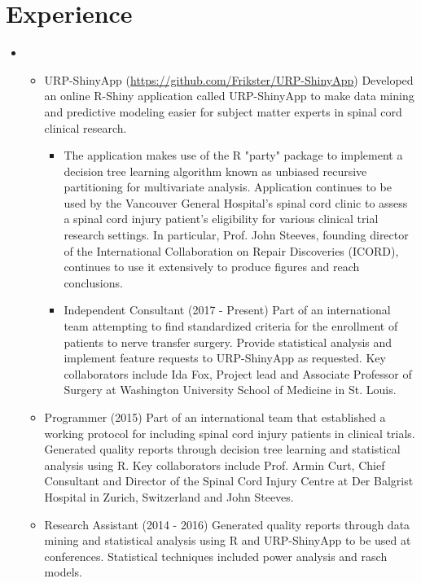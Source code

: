 \documentclass[11pt,a4paper,sans]{moderncv}        %
\begin{document}
\section{Experience}
\begin{itemize}
    \item{}
     
 \begin{itemize}
      \item{URP-ShinyApp (\href{https://github.com/Frikster/URP-ShinyApp}{https://github.com/Frikster/URP-ShinyApp})}
          {Developed an online R-Shiny application called URP-ShinyApp to make data mining and predictive modeling easier for subject matter experts in spinal cord clinical research.}
          \begin{itemize}
          \item{The application makes use of the R "party" package to implement a decision tree learning algorithm known as unbiased recursive partitioning for multivariate analysis. Application continues to be used by the Vancouver General Hospital's spinal cord clinic to assess a spinal cord injury patient's eligibility for various clinical trial research settings. In particular, Prof. John Steeves, founding director of the International Collaboration on Repair Discoveries (ICORD), continues to use it extensively to produce figures and reach conclusions.}
          \item{Independent Consultant (2017 - Present)}
          {Part of an international team attempting to find standardized criteria for the enrollment of patients to nerve transfer surgery. Provide statistical analysis and implement feature requests to URP-ShinyApp as requested. Key collaborators include Ida Fox, Project lead and Associate Professor of Surgery at Washington University School of Medicine in St. Louis.}
          \end{itemize}
        \item{Programmer (2015)}
          {Part of an international team that established a working protocol for including spinal cord injury patients in clinical trials. Generated quality reports through decision tree learning and statistical analysis using R. Key collaborators include Prof. Armin Curt, Chief Consultant and Director of the Spinal Cord Injury Centre at Der Balgrist Hospital in Zurich, Switzerland and John Steeves.}
        \item{Research Assistant (2014 - 2016)}
          {Generated quality reports through data mining and statistical analysis using R and URP-ShinyApp to be used at conferences. Statistical techniques included power analysis and rasch models.}
      \end{itemize}


\end{itemize}
\end{document}
